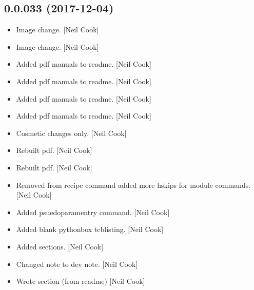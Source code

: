 \documentclass[a4paper,10pt,english]{report}
\begin{document}
\subsection{0.0.033 (2017-12-04)}
\label{\detokenize{misc/changelog:id518}}\begin{itemize}
\item {} 
Image change. {[}Neil Cook{]}

\item {} 
Image change. {[}Neil Cook{]}

\item {} 
Added pdf manuals to readme. {[}Neil Cook{]}

\item {} 
Added pdf manuals to readme. {[}Neil Cook{]}

\item {} 
Added pdf manuals to readme. {[}Neil Cook{]}

\item {} 
Added pdf manuals to readme. {[}Neil Cook{]}

\item {} 
Cosmetic changes only. {[}Neil Cook{]}

\item {} 
Rebuilt pdf. {[}Neil Cook{]}

\item {} 
Rebuilt pdf. {[}Neil Cook{]}

\item {} 
Removed  from recipe command added more hskips for module commands.
{[}Neil Cook{]}

\item {} 
Added psuedoparamentry command. {[}Neil Cook{]}

\item {} 
Added blank pythonbox tcblisting. {[}Neil Cook{]}

\item {} 
Added sections. {[}Neil Cook{]}

\item {} 
Changed note to dev note. {[}Neil Cook{]}

\item {} 
Wrote section (from readme) {[}Neil Cook{]}

\end{itemize}
\end{document}
